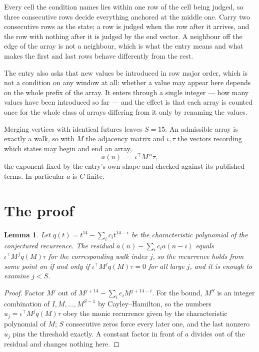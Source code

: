 \documentclass[11pt,a4paper]{article}
\theoremstyle{plain}
\newtheorem{lemma}[theorem]{Lemma}
\theoremstyle{definition}
\begin{document}
Every cell the condition names lies within one row of the cell being judged, so three consecutive rows decide everything anchored at the middle one. Carry two consecutive rows as the state; a row is judged when the row after it arrives, and the row with nothing after it is judged by the end vector. A neighbour off the edge of the array is not a neighbour, which is what the entry means and what makes the first and last rows behave differently from the rest.

The entry also asks that new values be introduced in row major order, which is not a condition on any window at all: whether a value may appear here depends on the whole prefix of the array. It enters through a single integer --- how many values have been introduced so far --- and the effect is that each array is counted once for the whole class of arrays differing from it only by renaming the values.

Merging vertices with identical futures leaves $S=15$. An admissible array is exactly a walk, so with $M$ the adjacency matrix and $\iota,\tau$ the vectors recording which states may begin and end an array,
\[
a(n)\;=\;\iota^{\!\top}M^{\,n}\tau ,
\]
the exponent fixed by the entry's own shape and checked against its published terms. In
particular $a$ is $C$-finite.

\section{The proof}

\begin{lemma}\label{lem:crit}
Let $q(t)=t^{14}-\sum_i c_it^{14-i}$ be the characteristic polynomial of the
conjectured recurrence. The residual $a(n)-\sum_ic_ia(n-i)$ equals
$\iota^{\!\top}M^{\,j}q(M)\tau$ for the corresponding walk index $j$, so the recurrence
holds from some point on if and only if $\iota^{\!\top}M^{j}q(M)\tau=0$ for all large $j$,
and it is enough to examine $j<S$.
\end{lemma}

\begin{proof}
Factor $M^{j}$ out of $M^{j+14}-\sum_ic_iM^{j+14-i}$. For the bound, $M^{S}$
is an integer combination of $I,M,\dots,M^{S-1}$ by Cayley--Hamilton, so the numbers
$u_j=\iota^{\!\top}M^{j}q(M)\tau$ obey the monic recurrence given by the characteristic
polynomial of $M$; $S$ consecutive zeros force every later one, and the last nonzero $u_j$
pins the threshold exactly. A constant factor in front of $a$ divides out of the residual and
changes nothing here.
\end{proof}
\end{document}

